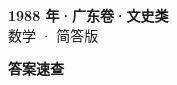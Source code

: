 \documentclass[zihao=-4, a4paper]{ctexart}
\begin{document}
\begin{center}
  {\Large\bfseries 1988 年·广东卷·文史类}\\[4pt]
  {\large 数学 · 简答版}
\end{center}
\medskip
{}

\clearpage
{}
\begin{center}{\Large\bfseries 答案速查}\end{center}
\medskip

\end{document}
